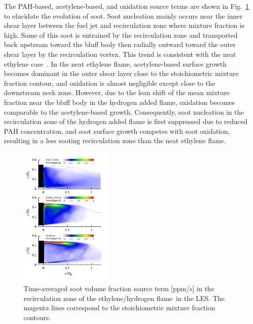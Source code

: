 \documentclass[review,3p,times]{elsarticle}
\begin{document}
The PAH-based, acetylene-based, and oxidation source terms are shown in Fig.~\ref{fig:sourceterms} to elucidate the evolution of soot. Soot nucleation mainly occurs near the inner shear layer between the fuel jet and recirculation zone where mixture fraction is high.  Some of this soot is entrained by the recirculation zone and transported back upstream toward the bluff body then radially outward toward the outer shear layer by the recirculation vortex.  This trend is consistent with the neat ethylene case~\cite{mueller13}.  In the neat ethylene flame, acetylene-based surface growth becomes dominant in the outer shear layer close to the stoichiometric mixture fraction contour, and oxidation is almost negligible except close to the downstream neck zone.  However, due to the lean shift of the mean mixture fraction near the bluff body in the hydrogen added flame, oxidation becomes comparable to the acetylene-based growth.  Consequently, soot nucleation in the recirculation zone of the hydrogen added flame is first suppressed due to reduced PAH concentration, and soot surface growth competes with soot oxidation, resulting in a less sooting recirculation zone than the neat ethylene flame.

 \begin{figure}[t]
  \centering
  \scriptsize
  \vspace{-0.10in}
  \includegraphics[trim=5mm 5.0mm 10mm 3.0mm, clip=true, width=0.4\textwidth]{sourceterm.png}
  \normalsize
  \vspace{-0.2in}
  \caption{Time-averaged soot volume fraction source term [ppm/s] in the recirculation zone of the ethylene/hydrogen flame~\textcolor{Rv1}{in the LES}.  The magenta lines correspond to the stoichiometric mixture fraction contours.}
  \label{fig:sourceterms}
\end{figure}
\end{document}

